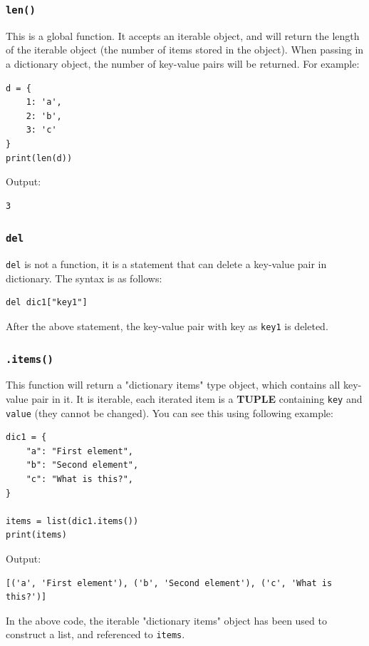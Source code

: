 \documentclass[12pt]{book}
\begin{document}
\subsubsection{\texttt{len()}}
\label{sec:org25de399}
This is a global function. It accepts an iterable object, and will return the length of the iterable object (the number of items stored in the object). When passing in a dictionary object, the number of key-value pairs will be returned. For example:
\begin{verbatim}
d = {
    1: 'a',
    2: 'b',
    3: 'c'
}
print(len(d))
\end{verbatim}
Output:
\begin{verbatim}
3
\end{verbatim}
\subsubsection{\texttt{del}}
\label{sec:org6c61f55}
\texttt{del} is not a function, it is a statement that can delete a key-value pair in dictionary. The syntax is as follows:
\begin{verbatim}
del dic1["key1"]
\end{verbatim}
After the above statement, the key-value pair with key as \texttt{key1} is deleted.
\subsubsection{\texttt{.items()}}
\label{sec:org9f8e923}
This function will return a "dictionary items" type object, which contains all key-value pair in it. It is iterable, each iterated item is a \textbf{TUPLE} containing \texttt{key} and \texttt{value} (they cannot be changed). You can see this using following example:
\begin{verbatim}
dic1 = {
    "a": "First element",
    "b": "Second element",
    "c": "What is this?",
}

items = list(dic1.items())
print(items)
\end{verbatim}
Output:
\begin{verbatim}
[('a', 'First element'), ('b', 'Second element'), ('c', 'What is this?')]
\end{verbatim}
In the above code, the iterable "dictionary items" object has been used to construct a list, and referenced to \texttt{items}.
\end{document}
